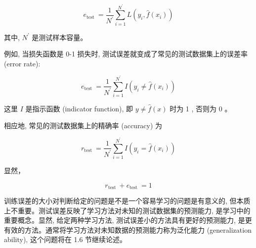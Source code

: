 \documentclass[10pt]{article}
\begin{document}
\begin{CJK*}{UTF8}{bsmi}
\begin{equation*}
e_{\text {test }}=\frac{1}{N^{\prime}} \sum_{i=1}^{N^{\prime}} L\left(y_{i}, \hat{f}\left(x_{i}\right)\right) \tag{1.19}
\end{equation*}


其中, $N^{\prime}$ 是测试样本容量。

例如, 当损失函数是 0-1 损失时, 测试误差就变成了常见的测试数据集上的误差率 (error rate):


\begin{equation*}
e_{\text {test }}=\frac{1}{N^{\prime}} \sum_{i=1}^{N^{\prime}} I\left(y_{i} \neq \hat{f}\left(x_{i}\right)\right) \tag{1.20}
\end{equation*}


这里 $I$ 是指示函数 (indicator function), 即 $y \neq \hat{f}(x)$ 时为 1 , 否则为 0 。

相应地, 常见的测试数据集上的精确率 (accuracy) 为


\begin{equation*}
r_{\text {test }}=\frac{1}{N^{\prime}} \sum_{i=1}^{N^{\prime}} I\left(y_{i}=\hat{f}\left(x_{i}\right)\right) \tag{1.21}
\end{equation*}


显然，

$$
r_{\text {test }}+e_{\text {test }}=1
$$

训练误差的大小对判断给定的问题是不是一个容易学习的问题是有意义的, 但本质上不重要。测试误差反映了学习方法对未知的测试数据集的预测能力, 是学习中的重要概念。显然, 给定两种学习方法, 测试误差小的方法具有更好的预测能力, 是更有效的方法。通常将学习方法对未知数据的预测能力称为泛化能力 (generalization ability), 这个问题将在 1.6 节继续论述。


\end{CJK*}
\end{document}
